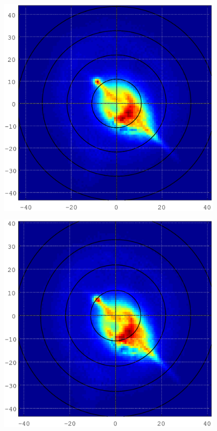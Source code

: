 \begin{figure}
\centering
\begin{minipage}{.5\textwidth}
  \centering
  \includegraphics[width=1\textwidth]{Graphics/centre_calibration_before.eps}
\label{centre_calibration_before}
\end{minipage}%
\begin{minipage}{.5\textwidth}
  \centering
  \includegraphics[width=1\textwidth]{Graphics/centre_calibration_after.eps}
\label{centre_calibration_after}
\end{minipage}
\end{figure}

